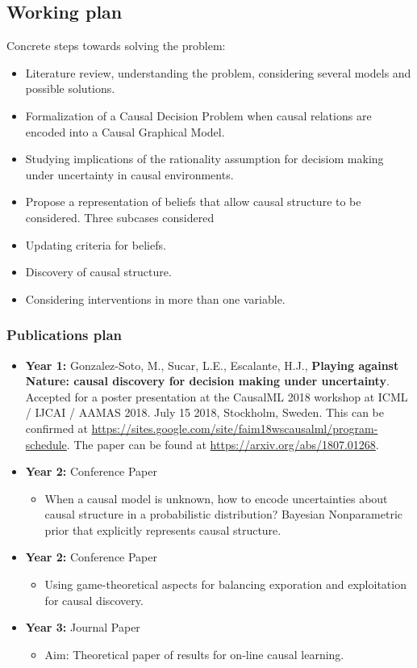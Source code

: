 \documentclass[english,letterpaper,12pt,final]{article}
\theoremstyle{definition}
\begin{document}
\subsection{Working plan}
Concrete steps towards solving the problem:
\begin{itemize}
\item Literature review, understanding the problem, considering several models and possible solutions.
\item Formalization of a Causal Decision Problem when causal relations are encoded into a Causal Graphical Model.
\item Studying implications of the rationality assumption for decisiom making under uncertainty in causal environments.
\item Propose a representation of beliefs that allow causal structure to be considered. Three subcases considered
\item Updating criteria for beliefs.
\item Discovery of causal structure.
\item Considering interventions in more than one variable.

\end{itemize}
\subsubsection{Publications plan}
\begin{itemize}
\item \textbf{Year 1:} Gonzalez-Soto, M., Sucar, L.E., Escalante, H.J., \textbf{Playing against Nature: causal discovery for decision making under uncertainty}. Accepted for a poster presentation at the CausalML 2018 workshop at ICML / IJCAI / AAMAS 2018. July 15 2018, Stockholm, Sweden. This can be confirmed at \url{https://sites.google.com/site/faim18wscausalml/program-schedule}. The paper can be found at \url{https://arxiv.org/abs/1807.01268}.
\item \textbf{Year 2:} Conference Paper
		\begin{itemize}
			\item When a causal model is unknown, how to encode uncertainties about causal structure in a probabilistic distribution? Bayesian Nonparametric prior that explicitly represents causal structure.
		\end{itemize}
\item \textbf{Year 2:} Conference Paper
	\begin{itemize}
		\item Using game-theoretical aspects for balancing exporation and exploitation for causal discovery. 
	\end{itemize}
\item \textbf{Year 3:} Journal Paper
		\begin{itemize}
			\item Aim: Theoretical paper of results for on-line causal learning.
		\end{itemize}
\end{itemize}
\end{document}
